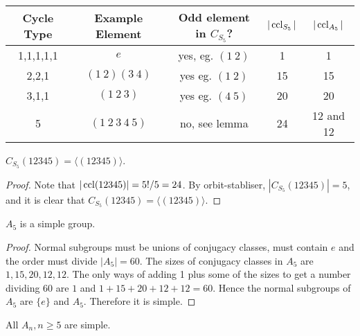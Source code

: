 \documentclass[10pt]{article}
\def\ge{\geqslant}
\begin{document}
      \begin{example}
        \begin{center}
            \begin{tabular}{c|c|c|c|c}
                Cycle Type & Example Element & Odd element in $C_{S_5}$? & $|\operatorname{ccl}_{S_5}|$ & $|\operatorname{ccl}_{A_5}|$ \\
                \hline 
                1,1,1,1,1 & $e$ & yes, eg. $(1\ 2)$ & 1 & 1\\
                2,2,1 & $(1\ 2)(3\ 4)$ & yes eg. $(1\ 2)$ & 15 & 15\\
                3,1,1 & $(1\ 2\ 3)$ & yes eg. $(4\ 5)$ & 20 & 20\\
                5 & $(1\ 2\ 3\ 4\ 5)$ & no, see lemma & 24 & 12 and 12\\
            \end{tabular}
        \end{center}
        \begin{lemma}\label{lma:5.31}
            $ C_{S_5}(12345)=\langle (12345) \rangle $.
        \end{lemma}
        \begin{proof}
            Note that $ |\operatorname{ccl}(12345)|=5!/5=24 $. By orbit-stabliser, $ |C_{S_5}(12345)|=5 $, and it is clear that $C_{S_5}(12345)=\langle (12345) \rangle$.
        \end{proof}
      \end{example}
      \begin{theorem}\label{thm:5.32}
          $A_5$ is a simple group.
      \end{theorem}
      \begin{proof}
          Normal subgroups must be unions of conjugacy classes, must contain $e$ and the order must divide $|A_5|=60$. The sizes of conjugacy classes in $A_5$ are $1,15,20,12,12$. The only ways of adding 1 plus some of the sizes to get a number dividing 60 are $ 1 $ and $ 1+15+20+12+12=60 $. Hence the normal subgroups of $A_5$ are $\{e\}$ and $A_5$. Therefore it is simple. 
      \end{proof}
      \begin{remark}
          All $A_n, n\ge 5$ are simple.
      \end{remark}
      
\end{document}

